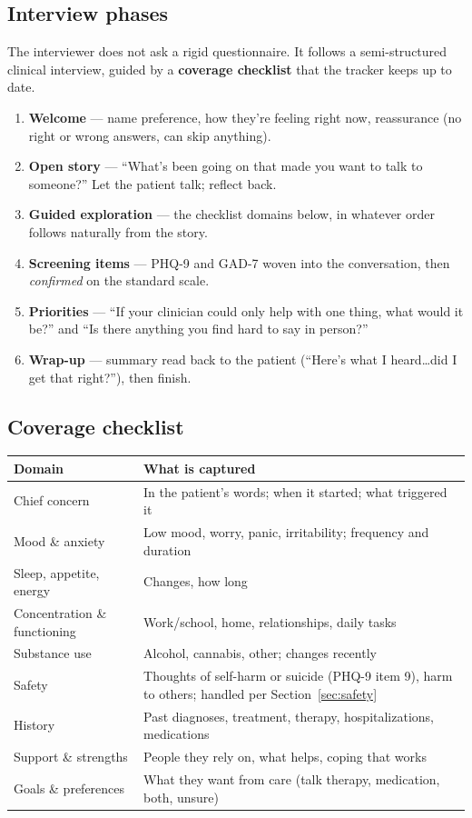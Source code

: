 \documentclass[11pt]{article}
\begin{document}
\subsection{Interview phases}
The interviewer does not ask a rigid questionnaire. It follows a semi-structured clinical interview, guided by a
\textbf{coverage checklist} that the tracker keeps up to date.

\begin{enumerate}
  \item \textbf{Welcome} --- name preference, how they're feeling right now, reassurance (no right or wrong answers, can skip anything).
  \item \textbf{Open story} --- ``What's been going on that made you want to talk to someone?'' Let the patient talk; reflect back.
  \item \textbf{Guided exploration} --- the checklist domains below, in whatever order follows naturally from the story.
  \item \textbf{Screening items} --- PHQ-9 and GAD-7 woven into the conversation, then \emph{confirmed} on the standard scale.
  \item \textbf{Priorities} --- ``If your clinician could only help with one thing, what would it be?'' and ``Is there anything you find hard to say in person?''
  \item \textbf{Wrap-up} --- summary read back to the patient (``Here's what I heard\ldots did I get that right?''), then finish.
\end{enumerate}

\subsection{Coverage checklist}
\begin{tabularx}{\textwidth}{@{}l X@{}}
\toprule
\textbf{Domain} & \textbf{What is captured} \\
\midrule
Chief concern & In the patient's words; when it started; what triggered it \\
Mood \& anxiety & Low mood, worry, panic, irritability; frequency and duration \\
Sleep, appetite, energy & Changes, how long \\
Concentration \& functioning & Work/school, home, relationships, daily tasks \\
Substance use & Alcohol, cannabis, other; changes recently \\
Safety & Thoughts of self-harm or suicide (PHQ-9 item 9), harm to others; handled per Section~\ref{sec:safety} \\
History & Past diagnoses, treatment, therapy, hospitalizations, medications \\
Support \& strengths & People they rely on, what helps, coping that works \\
Goals \& preferences & What they want from care (talk therapy, medication, both, unsure) \\
\bottomrule
\end{tabularx}
\end{document}
